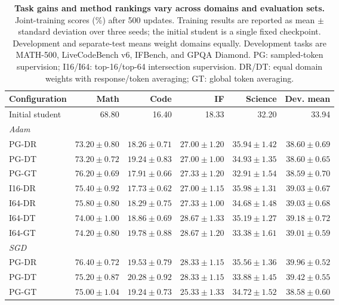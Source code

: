 \begin{table}[t]
\centering
\small
\setlength{\tabcolsep}{3.5pt}
\caption{\textbf{Task gains and method rankings vary across domains and evaluation sets.}
Joint-training scores (\%) after 500 updates.
Training results are reported as mean $\pm$ standard deviation over three seeds;
the initial student is a single fixed checkpoint.
Development and separate-test means weight domains equally.
Development tasks are MATH-500, LiveCodeBench v6, IFBench, and GPQA Diamond.
PG: sampled-token supervision; I16/I64: top-16/top-64 intersection supervision.
DR/DT: equal domain weights with response/token averaging; GT: global token averaging.}
\label{tab:main_outcomes}
\begin{tabular}{@{}lrrrrr@{}}
\toprule
Configuration & Math & Code & IF & Science & Dev. mean \\
\midrule
Initial student
& 68.80
& 16.40
& 18.33
& 32.20
& 33.94 \\
\midrule
\multicolumn{6}{l}{\textit{Adam}} \\

PG-DR
& $73.20 \pm 0.80$
& $18.26 \pm 0.71$
& $27.00 \pm 1.20$
& $35.94 \pm 1.42$
& $38.60 \pm 0.69$ \\

PG-DT
& $73.20 \pm 0.72$
& $19.24 \pm 0.83$
& $27.00 \pm 1.00$
& $34.93 \pm 1.35$
& $38.60 \pm 0.65$ \\

PG-GT
& $76.20 \pm 0.69$
& $17.91 \pm 0.66$
& $27.33 \pm 1.20$
& $32.91 \pm 1.54$
& $38.59 \pm 0.70$ \\

I16-DR
& $75.40 \pm 0.92$
& $17.73 \pm 0.62$
& $27.00 \pm 1.15$
& $35.98 \pm 1.31$
& $39.03 \pm 0.67$ \\

I64-DR
& $75.80 \pm 0.80$
& $18.29 \pm 0.75$
& $27.33 \pm 1.00$
& $34.68 \pm 1.48$
& $39.03 \pm 0.68$ \\

I64-DT
& $74.00 \pm 1.00$
& $18.86 \pm 0.69$
& $28.67 \pm 1.33$
& $35.19 \pm 1.27$
& $39.18 \pm 0.72$ \\

I64-GT
& $74.20 \pm 0.80$
& $19.78 \pm 0.88$
& $28.67 \pm 1.20$
& $33.38 \pm 1.61$
& $39.01 \pm 0.59$ \\

\midrule
\multicolumn{6}{l}{\textit{SGD}} \\

PG-DR
& $76.40 \pm 0.72$
& $19.53 \pm 0.79$
& $28.33 \pm 1.15$
& $35.56 \pm 1.36$
& $39.96 \pm 0.52$ \\

PG-DT
& $75.20 \pm 0.87$
& $20.28 \pm 0.92$
& $28.33 \pm 1.15$
& $33.88 \pm 1.45$
& $39.42 \pm 0.55$ \\

PG-GT
& $75.00 \pm 1.04$
& $19.24 \pm 0.73$
& $25.33 \pm 1.33$
& $34.72 \pm 1.52$
& $38.58 \pm 0.60$ \\

\bottomrule
\end{tabular}
\par\vspace{2pt}
\end{table}
